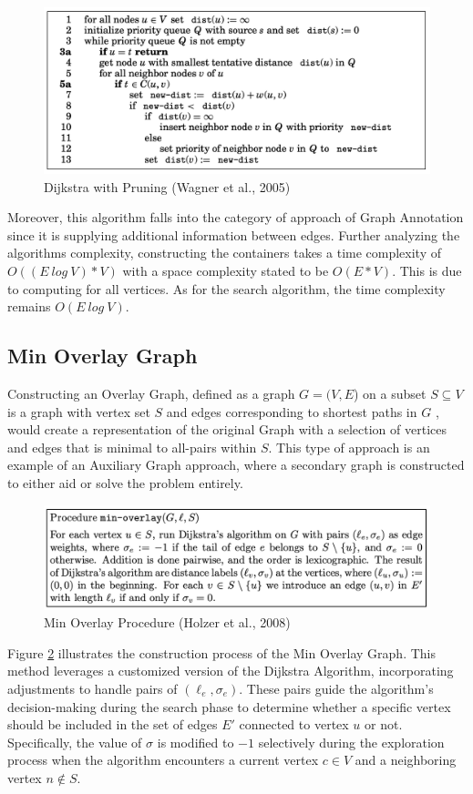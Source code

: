 \documentclass{article}
\begin{document}
\begin{figure}
    \centering
    \includegraphics[width=0.7\linewidth]{img/pruning.png}
    \caption{Dijkstra with Pruning (Wagner et al., 2005)}
    \label{fig:geodijkstra}
\end{figure}

Moreover, this algorithm falls into the category of approach of Graph Annotation since it is supplying additional information between edges. Further analyzing the algorithms complexity, constructing the containers takes a time complexity of $O((E \ log \ V) * V)$ with a space complexity stated to be $O(E * V)$. This is due to computing for all vertices. As for the search algorithm, the time complexity remains $O(E \ log \ V)$.

\subsection{Min Overlay Graph}

Constructing an Overlay Graph, defined as a graph $G = (V,E$) on a subset $S \subseteq V$ is a graph with vertex set $S$ and edges corresponding to shortest paths in $G$ \cite{Holzer2008}, would create a representation
of the original Graph with a selection of vertices and edges that is minimal
to all-pairs within $S$. This type of approach is an example of an Auxiliary Graph approach, where a secondary graph is constructed to either
aid or solve the problem entirely.

\begin{figure}
    \centering
    \includegraphics[width=0.7\linewidth]{img/minoverlay.png}
    \caption{Min Overlay Procedure (Holzer et al., 2008)}
    \label{fig:minoverlay}
\end{figure}

Figure \ref{fig:minoverlay} illustrates the construction process of the Min Overlay Graph. This method leverages a customized version of the Dijkstra Algorithm, incorporating adjustments to handle pairs of $(\ell_e, \sigma_e)$. These pairs guide the algorithm's decision-making during the search phase to determine whether a specific vertex should be included in the set of edges \(E'\) connected to vertex \(u\) or not. Specifically, the value of \(\sigma\) is modified to \( -1 \) selectively during the exploration process when the algorithm encounters a current vertex \(c \in V\) and a neighboring vertex \(n \notin S\).
\end{document}
